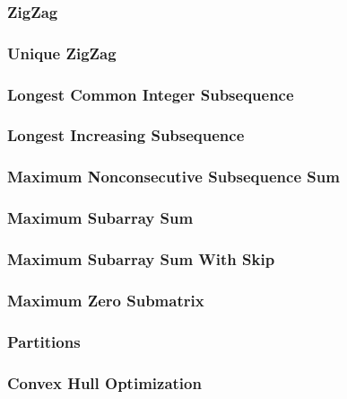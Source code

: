 \documentclass[8pt]{article}
\begin{document}
\subsubsection{ZigZag}

\subsubsection{Unique ZigZag}

\subsubsection{Longest Common Integer Subsequence}

\subsubsection{Longest Increasing Subsequence}

\subsubsection{Maximum Nonconsecutive Subsequence Sum}

\subsubsection{Maximum Subarray Sum}

\subsubsection{Maximum Subarray Sum With Skip}

\subsubsection{Maximum Zero Submatrix}

\subsubsection{Partitions}

\subsubsection{Convex Hull Optimization}

\end{document}
